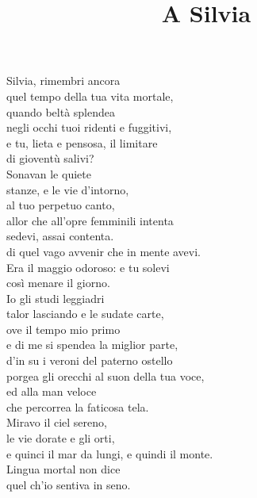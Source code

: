 \documentclass{article}
\title{A Silvia}
\author{}
\date{}
\newcommand{\notamargine}[1]{\marginnote{\color{grigio}\small#1}}
\begin{document}
\maketitle
\thispagestyle{empty}
\begin{vwcol}[widths={0.43,0.57},justify=flush,rule=0pt,indent=0em]
\reversemarginpar
Silvia, rimembri ancora\\
quel tempo della tua vita mortale,\\
quando beltà splendea\\
negli occhi tuoi ridenti e fuggitivi,\\
\notamargine{5.}
e tu, lieta e pensosa, il limitare\\
di gioventù salivi?\\

Sonavan le quiete\\
stanze, e le vie d'intorno,\\
al tuo perpetuo canto,\\
\notamargine{10.}
allor che all'opre femminili intenta\\
sedevi, assai contenta.\\
di quel vago avvenir che in mente avevi.\\
Era il maggio odoroso: e tu solevi\\
così menare il giorno.\\

\notamargine{15.}
Io gli studi leggiadri\\
talor lasciando e le sudate carte,\\
ove il tempo mio primo\\
e di me si spendea la miglior parte,\\
d’in su i veroni del paterno ostello\\
\notamargine{20.}
porgea gli orecchi al suon della tua voce,\\
ed alla man veloce\\
che percorrea la faticosa tela.\\
Miravo il ciel sereno,\\
le vie dorate e gli orti,\\
\notamargine{25.}
e quinci il mar da lungi, e quindi il monte.\\
Lingua mortal non dice\\
quel ch'io sentiva in seno.\\


\end{vwcol}
\end{document}
